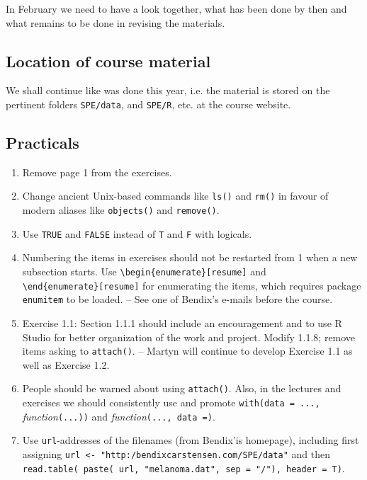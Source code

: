 In February we need to have a look together, what has been done  by then
and what remains to be done in revising the materials.

\subsection*{Location of course material}
We shall continue like was done this year, i.e. the material is stored on the pertinent folders 
\texttt{SPE/data}, and \texttt{SPE/R}, etc. at the course website.

\subsection*{Practicals}
\begin{enumerate}
\item Remove page 1 from the exercises.
\item Change ancient Unix-based commands like
 \texttt{ls()} and \texttt{rm()} in favour of modern aliases like  \texttt{objects()}
and \texttt{remove()}.
\item Use \texttt{TRUE} and \texttt{FALSE} instead of \texttt{T} and \texttt{F}
with logicals.
\item Numbering the items in exercises should not be restarted from 1 when a new subsection
starts. Use \verb|\begin{enumerate}[resume]| and \\ \verb|\end{enumerate}[resume]| 
for enumerating the items, which requires package \texttt{enumitem}
to be loaded. -- 
See one of Bendix's e-mails before the course.
\item Exercise 1.1: Section 1.1.1 should include an encouragement and 
to use R Studio for better organization of the work and project. 
Modify 1.1.8; remove items asking to \texttt{attach()}. -- Martyn will continue
to develop Exercise 1.1 as well as Exercise 1.2.
\item People should be warned about using \texttt{attach()}. Also,
   in the lectures and exercises we should consistently use and promote 
	\texttt{with(data = ...,} \textit{function}\texttt{(...))} and 
	 \textit{function}\texttt{(..., data =)}.	
\item Use \texttt{url}-addresses of the filenames (from Bendix'is homepage), including
first assigning \verb|url <- "http:/bendixcarstensen.com/SPE/data"| and then 
\verb|read.table( paste( url, "melanoma.dat", sep = "/"), header = T)|. 

\end{enumerate}
